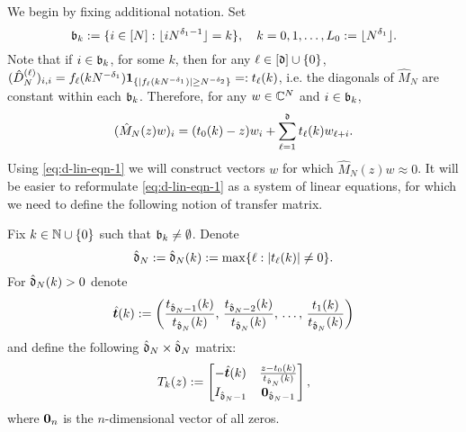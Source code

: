 \documentclass{amsart}
\numberwithin{equation}{section}
\def\corOZ{}
\begin{document}
\corOZ{We begin by fixing additional notation.}
\corOZ{Set}
\begin{equation}
  \label{eq-L0}
\gb_k:=\{i \in [N]:
  \lfloor i N^{\delta_1-1}\rfloor =k\}, \quad
  \corOZ{k=0,1,\ldots,L_0:=\lfloor N^{\delta_1}\rfloor.}
\end{equation}
Note that
  if $i \in \mathfrak{b}_k$, for some $k$, then
  for any $\ell \in [\mathfrak{d}] \cup \{0\}$,
  $(\hat{D}^{(\ell)}_N)_{i,i}=
  f_\ell(k N^{-\delta_1}){\bf 1}_{\{|f_\ell(k N^{-\delta_1})| \ge
  N^{-\delta_2}\}}=:t_\ell(k)$, i.e. the diagonals of $\hat M_N$ are constant
  within each $\mathfrak{b}_k$.
  Therefore, for any $w \in \mathbb{C}^N$ and $i \in \mathfrak{b}_k$,
\begin{equation}\label{eq:d-lin-eqn-1}
(\hat{M}_N(z) w)_i = (t_0(k)-z) w_i + \sum_{\ell=1}^{\mathfrak{d}} t_\ell(k) w_{\ell+i}.
\end{equation}
Using \eqref{eq:d-lin-eqn-1} we will construct vectors $w$ for which $\hat{M}_N(z) w \approx 0$. It will be easier to reformulate \eqref{eq:d-lin-eqn-1} as a system of linear equations, for which we need to define the following notion of transfer matrix.  %
\begin{dfn}\label{dfn:transfer-matrix}
Fix $k \in \mathbb N \cup \{0\}$ such that $\mathfrak{b}_k \ne \emptyset$. Denote
\[
\hat{\mathfrak{d}}_N:=\hat{\mathfrak{d}}_N(k):= \max\{\ell: |t_\ell(k)| \ne 0\}.
\]
For $\hat{\mathfrak{d}}_N(k) >0$ denote%
\[
\hat{\bm t}(k):= \left(\frac{t_{\hat{\mathfrak{d}}_N-1}(k)}{t_{\hat{\mathfrak{d}}_N}(k)}, \, \frac{t_{\hat{\mathfrak{d}}_N-2}(k)}{t_{\hat{\mathfrak{d}}_N}(k)}, \, \ldots, \, \frac{t_{1}(k)}{t_{\hat{\mathfrak{d}}_N}(k)}\right)
\]
and define the following $\hat{\mathfrak{d}}_N \times \hat{\mathfrak{d}}_N$ matrix:
\begin{align*}
T_k(z):= \begin{bmatrix} -\hat{\bm t}(k) & \frac{z-t_0(k)}{t_{\hat{\mathfrak{d}}_N}(k)}\\ I_{\hat{\mathfrak{d}}_N-1} & {\bf 0}_{\hat{\mathfrak{d}}_N-1}  \end{bmatrix},
\end{align*}
where ${\bf 0}_{n}$ is the $n$-dimensional vector of all zeros.
\end{dfn}
\end{document}
